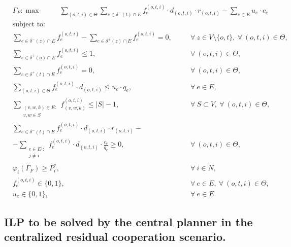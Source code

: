 \documentclass[review]{elsarticle}
\begin{document}
    \begin{align}
        &  \Gamma_F: \max  & \hspace{22pt} \sum_{(o,t,i)\in \Theta} \sum_{e \in \delta^-(t)\cap E}  f_e^{(o,t,i)} \cdot d_{(o,t,i)} \cdot r_{(o,t,i)} - \sum_{e\in E} u_{e}\cdot c_{e} \hspace{40pt} && 
    \end{align}
    \begin{align}
        & \text{subject to:}       && \nonumber \\
        & \sum_{e \in \delta^-(z)\cap E} f_e^{(o,t,i)} -\sum_{e \in \delta^+(z)\cap E} f_{e}^{(o,t,i)} = 0,\quad && \forall\ z\in V\setminus\{o,t\},\ \forall\ (o,t,i)\in\Theta, \\
& \sum_{e \in \delta^+(o)\cap E} f_e^{(o,t,i)} \leq 1, && \forall\ (o,t,i)\in \Theta, \\
 & \sum_{e \in \delta^+(t)\cap E} f_e^{(o,t,i)} = 0,  && \forall\ (o,t,i)\in \Theta,  \\
& \sum_{(o,t,i) \in \Theta} f_e^{(o,t,i)}\cdot d_{(o,t,i)}  \leq u_e\cdot q_e, && \forall\ e \in E,   \\
 & \sum_{\substack{(v,w,k) \in E\colon \\ v,w \in S}} f_{(v,w,k)}^{(o,t,i)} \leq |S| -1, && \forall\ S \subset V,\ \forall\ (o,t,i) \in \Theta,\\
&\sum_{e \in \delta^-(t)\cap E}  f_e^{(o,t,i)}  \cdot d_{(o,t,i)} \cdot r_{(o,t,i)} - && \nonumber\\
& -\sum_{\substack{e \in E^j\colon \\ j\not = i}} f_e^{(o,t,i)} \cdot d_{(o,t,i)} \cdot \frac{c_e}{q_e}\geq 0, && \forall\ (o,t,i) \in \Theta, \\
& \varphi_i(\Gamma_F) \geq P_i^*,  && \forall\ i\in N, \\
& f_e^{(o,t,i)} \in \{0,1\},  && \forall\ e \in E,\ \forall\ (o,t,i) \in \Theta,  \\
&  u_e  \in \{0,1\},  && \forall\ e \in E.
    \end{align}

\subsection{ILP to be solved by the central planner in the centralized residual cooperation scenario.}
\end{document}
